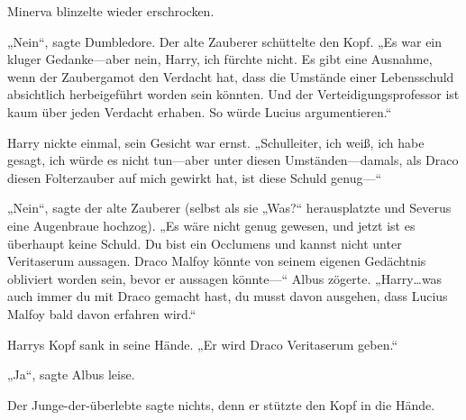 Minerva blinzelte wieder erschrocken.

„Nein“, sagte Dumbledore. Der alte Zauberer schüttelte den Kopf. „Es war ein kluger Gedanke—aber nein, Harry, ich fürchte nicht. Es gibt eine Ausnahme, wenn der Zaubergamot den Verdacht hat, dass die Umstände einer Lebensschuld absichtlich herbeigeführt worden sein könnten. Und der Verteidigungsprofessor ist kaum über jeden Verdacht erhaben. So würde Lucius argumentieren.“

Harry nickte einmal, sein Gesicht war ernst. „Schulleiter, ich weiß, ich habe gesagt, ich würde es nicht tun—aber unter diesen Umständen—damals, als Draco diesen Folterzauber auf mich gewirkt hat, ist diese Schuld genug—“

„Nein“, sagte der alte Zauberer (selbst als sie „Was?“ herausplatzte und Severus eine Augenbraue hochzog). „Es wäre nicht genug gewesen, und jetzt ist es überhaupt keine Schuld. Du bist ein Occlumens und kannst nicht unter Veritaserum aussagen. Draco Malfoy könnte von seinem eigenen Gedächtnis obliviert worden sein, bevor er aussagen könnte—“ Albus zögerte. „Harry…was auch immer du mit Draco gemacht hast, du musst davon ausgehen, dass Lucius Malfoy bald davon erfahren wird.“

Harrys Kopf sank in seine Hände. „Er wird Draco Veritaserum geben.“

„Ja“, sagte Albus leise.

Der Junge-der-überlebte sagte nichts, denn er stützte den Kopf in die Hände.

